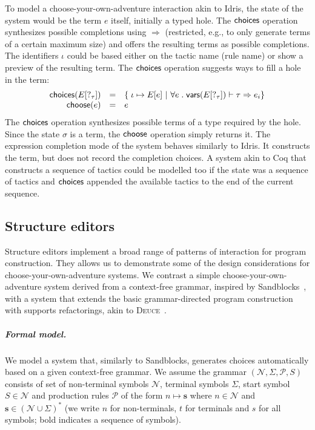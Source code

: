 \documentclass[anonymous, a4paper,UKenglish,cleveref, autoref, thm-restate]{lipics-v2021}
\newcommand{\ident}[1]{\textsf{#1}}
\newcommand{\select}{\textnormal{\ident{choose}}}
\newcommand{\choices}{\textnormal{\ident{choices}}}
\begin{document}
To model a choose-your-own-adventure interaction akin to Idris, the state of the system
would be the term $e$ itself, initially a typed hole. The $\choices$ operation synthesizes
possible completions using $\Rightarrow$ (restricted, e.g., to only generate terms of a certain
maximum size) and offers the resulting terms as possible completions. The identifiers $\iota$
could be based either on the tactic name (rule name) or show a preview of the resulting term.
The $\choices$ operation suggests ways to fill a hole in the term:
\[
\begin{array}{rcl}
\choices(E[?_\tau]) &=& \{\; \iota \mapsto E[e] ~|~ \forall e\;.\; \ident{vars}(E[?_\tau]) \vdash \tau \Rightarrow e_i \}\\
\select(e) &=& e
\end{array}
\]
The $\choices$ operation synthesizes possible terms of a type required by the hole. Since the
state $\sigma$ is a term, the $\select$ operation simply returns it. The expression completion
mode of the system behaves similarly to Idris. It constructs the term, but does not record the
completion choices. A system akin to Coq that constructs a sequence of tactics could be modelled
too if the state was a sequence of tactics and $\choices$ appended the available tactics
to the end of the current sequence.


\subsection{Structure editors}
\label{sec:examples-struct}

Structure editors implement a broad range of patterns of interaction for program construction.
They allows us to demonstrate some of the design considerations for
choose-your-own-adventure systems. We contrast a simple choose-your-own-adventure system
derived from a context-free grammar, inspired by Sandblocks~\cite{beckmann-2023-all},
with a system that extends the basic grammar-directed program construction with supports
refactorings, akin to \textsc{Deuce}~\cite{hempel-2018-deuce}.

\subparagraph{Formal model.}
We model a system that, similarly to Sandblocks, generates choices automatically based on a given
context-free grammar. We assume the grammar $(\mathcal{N},\Sigma,\mathcal{P},S)$ consists of set of
non-terminal symbols $\mathcal{N}$, terminal symbols $\Sigma$, start symbol $S\in\mathcal{N}$
and production rules $\mathcal{P}$ of the form $n\mapsto\boldsymbol{s}$ where
$n\in\mathcal{N}$ and $\boldsymbol{s}\in(\mathcal{N}\cup\Sigma)^{*}$ (we write $n$ for non-terminals,
$t$ for terminals and $s$ for all symbols; bold indicates a sequence of symbols).
\end{document}
